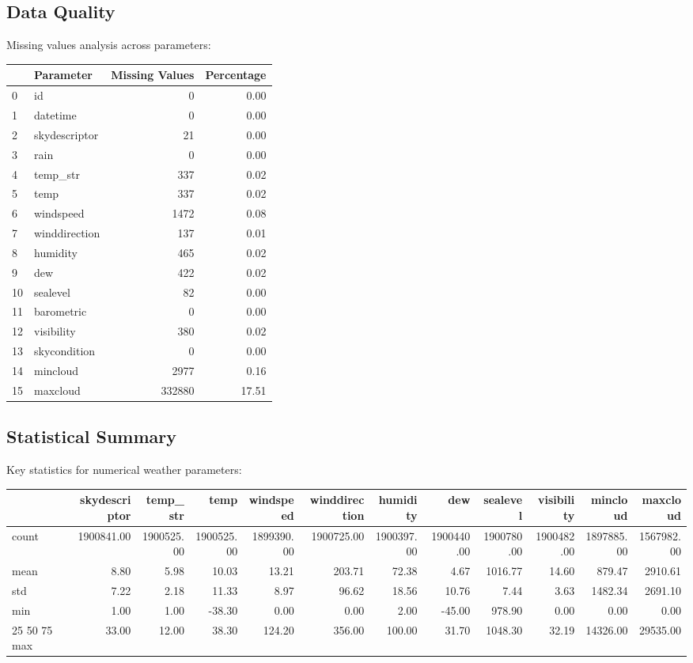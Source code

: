 \subsection{Data Quality}
Missing values analysis across parameters:
\begin{tabular}{llrr}
\toprule
 & Parameter & Missing Values & Percentage \\
\midrule
0 & id & 0 & 0.00 \\
1 & datetime & 0 & 0.00 \\
2 & skydescriptor & 21 & 0.00 \\
3 & rain & 0 & 0.00 \\
4 & temp_str & 337 & 0.02 \\
5 & temp & 337 & 0.02 \\
6 & windspeed & 1472 & 0.08 \\
7 & winddirection & 137 & 0.01 \\
8 & humidity & 465 & 0.02 \\
9 & dew & 422 & 0.02 \\
10 & sealevel & 82 & 0.00 \\
11 & barometric & 0 & 0.00 \\
12 & visibility & 380 & 0.02 \\
13 & skycondition & 0 & 0.00 \\
14 & mincloud & 2977 & 0.16 \\
15 & maxcloud & 332880 & 17.51 \\
\bottomrule
\end{tabular}

\subsection{Statistical Summary}
Key statistics for numerical weather parameters:
\begin{tabular}{lrrrrrrrrrrr}
\toprule
 & skydescriptor & temp_str & temp & windspeed & winddirection & humidity & dew & sealevel & visibility & mincloud & maxcloud \\
\midrule
count & 1900841.00 & 1900525.00 & 1900525.00 & 1899390.00 & 1900725.00 & 1900397.00 & 1900440.00 & 1900780.00 & 1900482.00 & 1897885.00 & 1567982.00 \\
mean & 8.80 & 5.98 & 10.03 & 13.21 & 203.71 & 72.38 & 4.67 & 1016.77 & 14.60 & 879.47 & 2910.61 \\
std & 7.22 & 2.18 & 11.33 & 8.97 & 96.62 & 18.56 & 10.76 & 7.44 & 3.63 & 1482.34 & 2691.10 \\
min & 1.00 & 1.00 & -38.30 & 0.00 & 0.00 & 2.00 & -45.00 & 978.90 & 0.00 & 0.00 & 0.00 \\
25%
50%
75%
max & 33.00 & 12.00 & 38.30 & 124.20 & 356.00 & 100.00 & 31.70 & 1048.30 & 32.19 & 14326.00 & 29535.00 \\
\bottomrule
\end{tabular}

